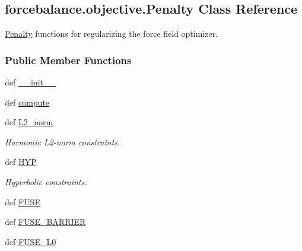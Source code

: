 \hypertarget{classforcebalance_1_1objective_1_1Penalty}{\subsection{forcebalance.\-objective.\-Penalty Class Reference}
\label{classforcebalance_1_1objective_1_1Penalty}
}


\hyperlink{classforcebalance_1_1objective_1_1Penalty}{Penalty} functions for regularizing the force field optimizer.  


\subsubsection*{Public Member Functions}
\begin{DoxyCompactItemize}
\item 
def \hyperlink{classforcebalance_1_1objective_1_1Penalty_aa2df9566dd3b054b48ddac60eae56f1f}{\-\_\-\-\_\-init\-\_\-\-\_\-}
\item 
def \hyperlink{classforcebalance_1_1objective_1_1Penalty_a844137de5dfb3e7907c37769d1306495}{compute}
\item 
def \hyperlink{classforcebalance_1_1objective_1_1Penalty_ab59d5beafbab0918b7c3e0c61ece41a3}{L2\-\_\-norm}
\begin{DoxyCompactList}\small\item\em Harmonic L2-\/norm constraints. \end{DoxyCompactList}\item 
def \hyperlink{classforcebalance_1_1objective_1_1Penalty_a1f3fa55d1c27db3eca0af41bb57c04ef}{H\-Y\-P}
\begin{DoxyCompactList}\small\item\em Hyperbolic constraints. \end{DoxyCompactList}\item 
def \hyperlink{classforcebalance_1_1objective_1_1Penalty_aafc1810e03e4e3f2ca1569588a8189d4}{F\-U\-S\-E}
\item 
def \hyperlink{classforcebalance_1_1objective_1_1Penalty_a9badc0a78d23016aa3dcc2d610e2e16c}{F\-U\-S\-E\-\_\-\-B\-A\-R\-R\-I\-E\-R}
\item 
def \hyperlink{classforcebalance_1_1objective_1_1Penalty_ab54cfe22065a5aa22766e16cc8cb90aa}{F\-U\-S\-E\-\_\-\-L0}
\end{DoxyCompactItemize}
